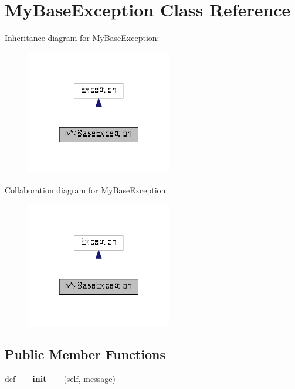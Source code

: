 \hypertarget{classminixfs_1_1_my_base_exception}{}\section{My\+Base\+Exception Class Reference}
\label{classminixfs_1_1_my_base_exception}


Inheritance diagram for My\+Base\+Exception\+:
\nopagebreak
\begin{figure}[H]
\begin{center}
\leavevmode
\includegraphics[width=181pt]{classminixfs_1_1_my_base_exception__inherit__graph}
\end{center}
\end{figure}


Collaboration diagram for My\+Base\+Exception\+:
\nopagebreak
\begin{figure}[H]
\begin{center}
\leavevmode
\includegraphics[width=181pt]{classminixfs_1_1_my_base_exception__coll__graph}
\end{center}
\end{figure}
\subsection*{Public Member Functions}
\begin{DoxyCompactItemize}
\item 
\hypertarget{classminixfs_1_1_my_base_exception_a692fa1576e9775a92420b5656e2c00a8}{}def {\bfseries \+\_\+\+\_\+init\+\_\+\+\_\+} (self, message)\label{classminixfs_1_1_my_base_exception_a692fa1576e9775a92420b5656e2c00a8}

\end{DoxyCompactItemize}
